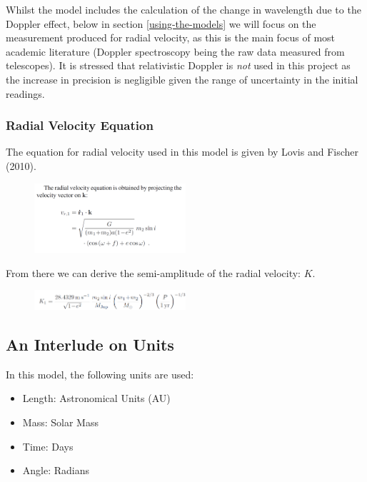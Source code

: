 \documentclass[11pt]{article}
\begin{document}
Whilst the model includes the calculation of the change in wavelength
due to the Doppler effect, below in section \ref{using-the-models} we will focus on the measurement produced for radial velocity, as this is the main focus of most academic literature (Doppler spectroscopy being the raw data measured from telescopes). It is stressed that relativistic Doppler is \emph{not} used in this project as the increase in precision is negligible given the range of uncertainty in the initial readings.

\hypertarget{radial-velocity-equation}{%
\subsubsection{Radial Velocity Equation}\label{radial-velocity-equation}}

The equation for radial velocity used in this model is given by Lovis
and Fischer (2010).

\begin{figure}[H]
	\centering
	\includegraphics[width=0.5\textwidth]{../images/radial_velocity.png}
	\label{Figure 2.g}
\end{figure}

From there we can derive the semi-amplitude of the radial velocity: \(K\).

\begin{figure}[H]
   	\centering
   	\includegraphics[width=0.5\textwidth]{../images/K_star.png}
   	\label{Figure 2.h}
\end{figure}

    \hypertarget{an-interlude-on-units}{%
\subsection{An Interlude on Units}\label{an-interlude-on-units}}

In this model, the following units are used: 

\begin{itemize}
	\item Length: Astronomical Units (AU)
	\item Mass: Solar Mass
	\item Time: Days
	\item Angle: Radians
\end{itemize}
\end{document}
